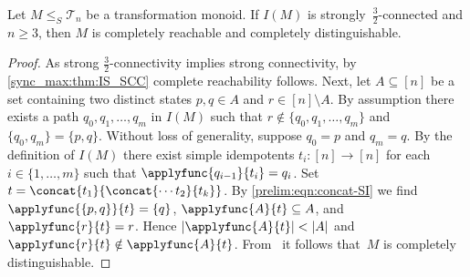 \begin{theorem}
	\label{sync_max:thm:IS_32SCC}
	Let $M \le_S \mathcal T_n$ be a transformation monoid. If $I(M)$ is strongly~$\frac{3}{2}$-connected and $n \ge 3$,
	then $M$ is completely reachable and completely distinguishable.
\end{theorem} 
\begin{proof}
	As strong $\frac{3}{2}$-connectivity implies strong connectivity,
	by \cref{sync_max:thm:IS_SCC}
	complete reachability follows.
	Next, let $A \subseteq [n]$ be a set containing
	two distinct states $p, q \in A$
	and $r \in [n] \setminus A$.
	By assumption there exists a path $q_0, q_1, \ldots, q_m$
	in $I(M)$ such that $r \notin \{q_0, q_1, \ldots, q_m\}$
	and $\{q_0, q_m\} = \{p,q\}$.
	Without loss of generality,
	suppose $q_0 = p$ and $q_m = q$.
	By the definition of $I(M)$ there exist
	simple idempotents $t_i \colon [n]\to [n]$
	for each $i \in \{1,\ldots,m\}$
	such that $\applyfunc{q_{i-1}}{t_i} = q_i$.
	Set $t = \concat{t_1}{\concat{\cdots t_2}{t_k}}$.  
	By \cref{prelim:eqn:concat-SI}
	we find $\applyfunc{\{p,q\}}{t} = \{q\}$, $\applyfunc{A}{t} \subseteq A$,
	and $\applyfunc{r}{t} = r$.
	Hence $|\applyfunc{A}{t}| < |A|$
	and $\applyfunc{r}{t} \notin \applyfunc{A}{t}$.
	From~
	it follows that~$M$ is completely distinguishable.	

\end{proof}
